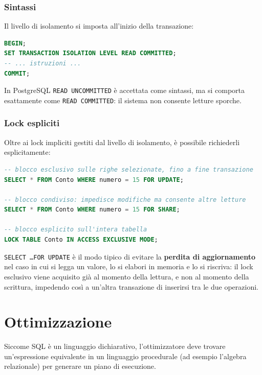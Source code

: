 \documentclass[a4paper,twoside]{article}
\begin{document}
\subsubsection*{Sintassi}
Il livello di isolamento si imposta all'inizio della transazione:
\begin{lstlisting}[language=SQL, numbers=none]
BEGIN;
SET TRANSACTION ISOLATION LEVEL READ COMMITTED;
-- ... istruzioni ...
COMMIT;
\end{lstlisting}

\noindent
In PostgreSQL \texttt{READ UNCOMMITTED} è accettata come sintassi, ma si comporta
esattamente come \texttt{READ COMMITTED}: il sistema non consente letture sporche.

\subsubsection*{Lock espliciti}
Oltre ai lock impliciti gestiti dal livello di isolamento, è possibile richiederli
esplicitamente:
\begin{lstlisting}[language=SQL, numbers=none]
-- blocco esclusivo sulle righe selezionate, fino a fine transazione
SELECT * FROM Conto WHERE numero = 15 FOR UPDATE;

-- blocco condiviso: impedisce modifiche ma consente altre letture
SELECT * FROM Conto WHERE numero = 15 FOR SHARE;

-- blocco esplicito sull'intera tabella
LOCK TABLE Conto IN ACCESS EXCLUSIVE MODE;
\end{lstlisting}

\noindent
\texttt{SELECT \ldots FOR UPDATE} è il modo tipico di evitare la \textbf{perdita di
aggiornamento} nel caso in cui si legga un valore, lo si elabori in memoria e lo si
riscriva: il lock esclusivo viene acquisito già al momento della lettura, e non al
momento della scrittura, impedendo così a un'altra transazione di inserirsi tra le due
operazioni.

\section{Ottimizzazione}
Siccome SQL è un linguaggio dichiarativo, l'ottimizzatore deve trovare un'espressione
equivalente in un linguaggio procedurale (ad esempio l'algebra relazionale) per
generare un piano di esecuzione.
\end{document}
